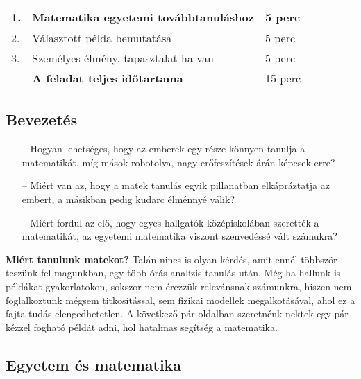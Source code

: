 \documentclass[../Main.tex]{subfiles}
\begin{document}
\begin{center}
    \begin{tabular}{| m{1.3 em} | m{} | m{} |}
    \hline
    1. & Matematika egyetemi továbbtanuláshoz & 5 perc \\
    \hline
    2. & Választott példa bemutatása & 5 perc \\
    \hline
    3. & Személyes élmény, tapasztalat ha van & 5 perc \\
    \hline
    - & \textbf{A feladat teljes időtartama} & 15 perc \\
    \hline
    \end{tabular}
\end{center}

\subsection{Bevezetés}

\begin{itemize}
    \item[--] Hogyan lehetséges, hogy az emberek egy része könnyen tanulja a matematikát, míg
mások robotolva, nagy erőfeszítések árán képesek erre?
    \item[--] Miért van az, hogy a matek tanulás egyik pillanatban elkápráztatja az embert, a
másikban pedig kudarc élménnyé válik?
    \item[--] Miért fordul az elő, hogy egyes hallgatók középiskolában szerették a matematikát, az
egyetemi matematika viszont szenvedéssé vált számukra?
\end{itemize}

\begin{flushleft}

\textbf{Miért tanulunk matekot?} Talán nincs is olyan kérdés, amit ennél többször teszünk fel magunkban,
egy több órás analízis tanulás után. Még ha hallunk
is példákat gyakorlatokon, sokszor nem érezzük relevánsnak számunkra,
hiszen nem foglalkoztunk mégsem titkosítással, sem fizikai modellek megalkotásával,
ahol ez a fajta tudás elengedhetetlen. A következő pár oldalban szeretnénk nektek 
egy pár kézzel fogható példát adni, hol hatalmas segítség a matematika. 

\end{flushleft}

\subsection{Egyetem és matematika}
\end{document}
